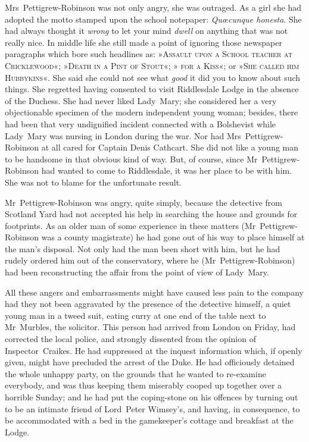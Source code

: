 Mrs~Pettigrew-Robinson was not only angry, she was outraged. As a girl she had adopted the motto stamped upon the school notepaper: \textit{Quœcunque honesta}. She had always thought it \textit{wrong} to let your mind \textit{dwell} on anything that was not really nice. In middle life she still made a point of ignoring those newspaper paragraphs which bore such headlines as: »\textsc{Assault upon a School teacher at Cricklewood}«; »\textsc{Death in a Pint of Stout}«; »\textsc{ for a Kiss}«; or »\textsc{She called him Hubbykins}«. She said she could not see what \textit{good} it did you to know about such things. She regretted having consented to visit Riddlesdale Lodge in the absence of the Duchess. She had never liked Lady~Mary; she considered her a very objectionable specimen of the modern independent young woman; besides, there had been that very undignified incident connected with a Bolshevist while Lady~Mary was nursing in London during the war. Nor had Mrs~Pettigrew-Robinson at all cared for Captain Denis Cathcart. She did not like a young man to be handsome in that obvious kind of way. But, of course, since Mr~Pettigrew-Robinson had wanted to come to Riddlesdale, it was her place to be with him. She was not to blame for the unfortunate result.

Mr~Pettigrew-Robinson was angry, quite simply, because the detective from Scotland Yard had not accepted his help in searching the house and grounds for footprints. As an older man of some experience in these matters (Mr~Pettigrew-Robinson was a county magistrate) he had gone out of his way to place himself at the man's disposal. Not only had the man been short with him, but he had rudely ordered him out of the conservatory, where he (Mr~Pettigrew-Robinson) had been reconstructing the affair from the point of view of Lady~Mary.

All these angers and embarrassments might have caused less pain to the company had they not been aggravated by the presence of the detective himself, a quiet young man in a tweed suit, eating curry at one end of the table next to Mr~Murbles, the solicitor. This person had arrived from London on Friday, had corrected the local police, and strongly dissented from the opinion of Inspector~Craikes. He had suppressed at the inquest information which, if openly given, might have precluded the arrest of the Duke. He had officiously detained the whole unhappy party, on the grounds that he wanted to re-examine everybody, and was thus keeping them miserably cooped up together over a horrible Sunday; and he had put the coping-stone on his offences by turning out to be an intimate friend of Lord~Peter Wimsey's, and having, in consequence, to be accommodated with a bed in the gamekeeper's cottage and breakfast at the Lodge.

